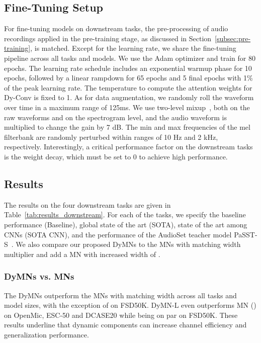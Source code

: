 \documentclass[lettersize,journal]{IEEEtran}
\begin{document}
\subsection{Fine-Tuning Setup}

For fine-tuning models on downstream tasks, the pre-processing of audio recordings applied in the pre-training stage, as discussed in Section~\ref{subsec:pre-training}, is matched. Except for the learning rate, we share the fine-tuning pipeline across all tasks and models. We use the Adam optimizer and train for 80 epochs. The learning rate schedule includes an exponential warmup phase for 10 epochs, followed by a linear rampdown for 65 epochs and 5 final epochs with 1\% of the peak learning rate. The temperature  to compute the attention weights for Dy-Conv is fixed to 1. As for data augmentation, we randomly roll the waveform over time in a maximum range of 125ms. We use two-level mixup~\cite{Zhang18mixup}, both on the raw waveforms and on the spectrogram level, and the audio waveform is multiplied to change the gain by 7 dB. The min and max frequencies of the mel filterbank are randomly perturbed within ranges of 10 Hz and 2 kHz, respectively. Interestingly, a critical performance factor on the downstream tasks is the weight decay, which must be set to 0 to achieve high performance.



\subsection{Results}

The results on the four downstream tasks are given in Table~\ref{tab:results_downstream}. For each of the tasks, we specify the baseline performance (Baseline), global state of the art (SOTA), state of the art among CNNs (SOTA CNN), and the performance of the AudioSet teacher model PaSST-S~\cite{Koutini21Passt}. We also compare our proposed DyMNs to the MNs with matching width multiplier and add a MN with increased width of .  

\subsubsection{DyMNs vs. MNs} The DyMNs outperform the MNs with matching width across all tasks and model sizes, with the exception of  on FSD50K. DyMN-L even outperforms MN () on OpenMic, ESC-50 and DCASE20 while being on par on FSD50K. These results underline that dynamic components can increase channel efficiency and generalization performance. 
\end{document}
